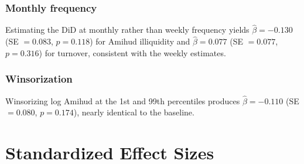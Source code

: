 \documentclass[12pt]{article}
\begin{document}
\subsubsection*{Monthly frequency} Estimating the DiD at monthly rather than weekly frequency yields $\hat{\beta} = -0.130$ (SE $= 0.083$, $p = 0.118$) for Amihud illiquidity and $\hat{\beta} = 0.077$ (SE $= 0.077$, $p = 0.316$) for turnover, consistent with the weekly estimates.

\subsubsection*{Winsorization} Winsorizing log Amihud at the 1st and 99th percentiles produces $\hat{\beta} = -0.110$ (SE $= 0.080$, $p = 0.174$), nearly identical to the baseline.


\section{Standardized Effect Sizes}
\label{sec:sde}


\end{document}
